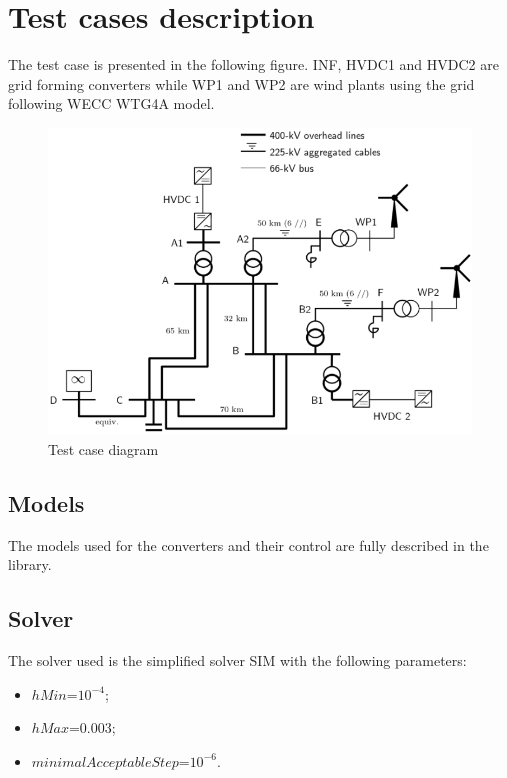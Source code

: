 \documentclass[a4paper, 12pt]{report}
\begin{document}
\section{Test cases description}

\par The test case is presented in the following figure. INF, HVDC1 and HVDC2 are grid forming converters while WP1 and WP2 are wind plants using the grid following WECC WTG4A model.

\begin{figure}[H]
  \includegraphics[width=\textwidth]{GFMGFL.png}
  \caption{Test case diagram}
\end{figure}

\subsection{Models}

\par The models used for the converters and their control are fully described in the \Dynawo library.

\subsection{Solver}

\par The solver used is the simplified solver SIM with the following parameters:

\begin{itemize}
\item $hMin$=$10^{-4}$;
\item $hMax$=$0.003$;
\item $minimalAcceptableStep$=$10^{-6}$.
\end{itemize}
\end{document}

